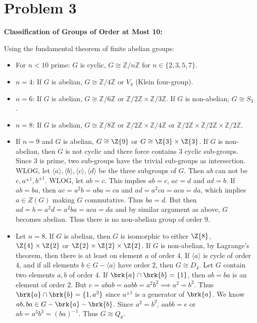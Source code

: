 \documentclass[12pt]{article}
\begin{document}
\section*{Problem 3}

\textbf{Classification of Groups of Order at Most 10:}

Using the fundamental theorem of finite abelian groups:
\begin{itemize}
    \item For $n < 10$ prime: $G$ is cyclic, $G \cong \mathbb{Z}/n\mathbb{Z}$ for $n \in \{2, 3, 5, 7\}$.
    \item $n = 4$: If $G$ is abelian, $G \cong \mathbb{Z}/4\mathbb{Z}$ or $V_4$ (Klein four-group).
    \item $n = 6$: If $G$ is abelian, $G \cong \mathbb{Z}/6\mathbb{Z}$ or $\mathbb{Z}/2\mathbb{Z} \times \mathbb{Z}/3\mathbb{Z}$. If $G$ is non-abelian, $G \cong S_3$.
    \item $n = 8$: If $G$ is abelian, $G \cong \mathbb{Z}/8\mathbb{Z}$ or $\mathbb{Z}/2\mathbb{Z} \times \mathbb{Z}/4\mathbb{Z}$ or $\mathbb{Z}/2\mathbb{Z} \times \mathbb{Z}/2\mathbb{Z} \times \mathbb{Z}/2\mathbb{Z}$.

         \item If $n = 9$ and $G$ is abelian, $G \cong  \Z{9} $ or $G \cong \Z{3} \times \Z{3}$. If $G$ is non-abelian, then $G$ is not cyclic and there force contains $3$ cyclic sub-groups. Since $3$ is prime, two sub-groups have the trivial sub-groups as intersection. WLOG, let $\langle a\rangle, \langle b\rangle, \langle c\rangle, \langle d\rangle$ be the three subgroups of $G$. Then $ab$ can not be $e, a^{\pm 1}, b^{\pm 1}$. WLOG, let $ab = c$. This implies $ab = c$, $ac = d$ and $ad = b$. If $ab = ba$, then $ac = a^2 b = aba = ca$ and $ad = a^2ca = aca = da$, which implies $a \in Z(G)$ making $G$ commutative. Thus $ba = d$. But then $ad = b = a^2d = a^2ba = aca = da$ and by similar argument as above, $G$ becomes abelian. Thus there is no non-abelian group of order $9$.

        
         \item Let $n = 8$. If $G$ is abelian, then $ G $ is isomorphic to either $\Z{8}$, $\Z{4} \times \Z{2}$ or $\Z{2} \times \Z{2} \times \Z{2}$. If $G$ is non-abelian, by Lagrange's theorem, then there is at least on element $a$ of order $4$. If $\langle a \rangle$ is cycle of order $4$, and if all elements $b \in G - \langle a \rangle$ have order $2$, then $G \cong D_4$. Let $G$ contain two elements $a, b$ of order $4$. If $\brk{a} \cap \brk{b} = \{1\}$, then $ab = ba $ is an element of order $2$. But $e = abab = aabb = a^2b^2 \implies a^2 = b^2$. Thus $\brk{a} \cap \brk{b} = \{1, a^2\}$ since $a^{\pm 1}$ is a generator of $\brk{a}$. We know $ab, ba \in G - \brk{a} - \brk{b}$. Since $a^2 = b^2$, $aabb = e$ or $ab = a^3b^3 = (ba)^{-1}$. Thus $G\cong Q_8$. 
    \end{itemize}
\end{document}
